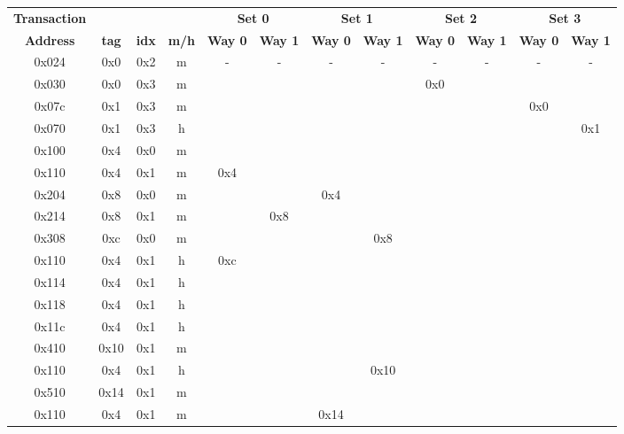 \documentclass[10pt]{article}
\begin{document}
\begin{figure}[H]
\centering
\begin{tabular}{@{\extracolsep{3pt}}cccccccccccc@{}}
\Xhline{2\arrayrulewidth}
\textbf{Transaction} & & & & \multicolumn{2}{c}{\textbf{Set 0}} & \multicolumn{2}{c}{\textbf{Set 1}} & \multicolumn{2}{c}{\textbf{Set 2}} & \multicolumn{2}{c}{\textbf{Set 3}} \\
\cline{5-6}
\cline{7-8}
\cline{9-10}
\cline{11-12}
\textbf{Address} & \textbf{tag} & \textbf{idx} & \textbf{m/h} & \textbf{Way 0} & \textbf{Way 1} & \textbf{Way 0} & \textbf{Way 1} & \textbf{Way 0} & \textbf{Way 1} & \textbf{Way 0} & \textbf{Way 1} \\
\Xhline{2\arrayrulewidth}
0x024 & 0x0 & 0x2 & m &  -  &  -  &  -  &  -  &  -  &  -  &  -  &  -  \\
0x030 & 0x0 & 0x3 & m &     &     &     &     & 0x0 &     &     &     \\
0x07c & 0x1 & 0x3 & m &     &     &     &     &     &     & 0x0 &     \\
0x070 & 0x1 & 0x3 & h &     &     &     &     &     &     &     & 0x1 \\
0x100 & 0x4 & 0x0 & m &     &     &     &     &     &     &     &     \\
0x110 & 0x4 & 0x1 & m & 0x4 &     &     &     &     &     &     &     \\
0x204 & 0x8 & 0x0 & m &     &     & 0x4 &     &     &     &     &     \\
0x214 & 0x8 & 0x1 & m &     & 0x8 &     &     &     &     &     &     \\
0x308 & 0xc & 0x0 & m &     &     &     & 0x8 &     &     &     &     \\
0x110 & 0x4 & 0x1 & h & 0xc &     &     &     &     &     &     &     \\
0x114 & 0x4 & 0x1 & h &     &     &     &     &     &     &     &     \\
0x118 & 0x4 & 0x1 & h &     &     &     &     &     &     &     &     \\
0x11c & 0x4 & 0x1 & h &     &     &     &     &     &     &     &     \\
0x410 & 0x10& 0x1 & m &     &     &     &     &     &     &     &     \\
0x110 & 0x4 & 0x1 & h &     &     &     & 0x10&     &     &     &     \\
0x510 & 0x14& 0x1 & m &     &     &     &     &     &     &     &     \\
0x110 & 0x4 & 0x1 & m &     &     & 0x14&     &     &     &     &     \\

\end{tabular}
\end{figure}
\end{document}
